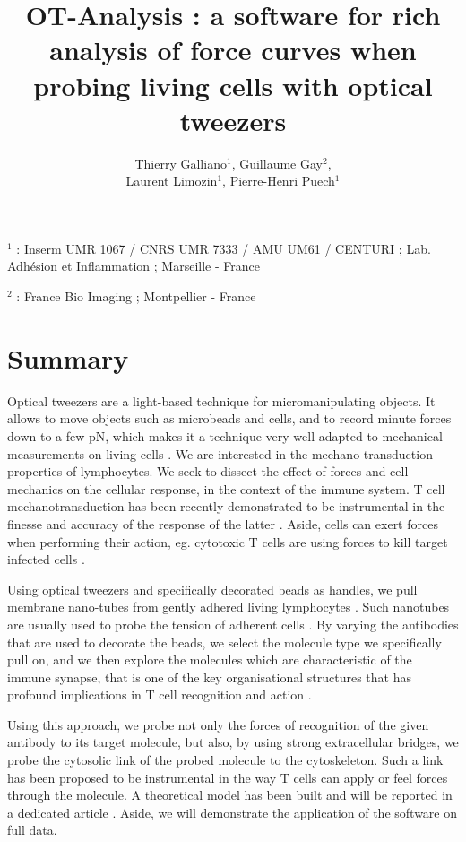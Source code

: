 \documentclass[a4paper]{article}
\title{OT-Analysis : a software for rich analysis of force
	curves when probing living cells with optical tweezers }
\author{Thierry Galliano$^1$, Guillaume Gay$^2$,\\ Laurent Limozin$^1$, Pierre-Henri Puech$^1$}
\date{}
\begin{document}
\maketitle

\noindent $^1$ : Inserm UMR 1067 / CNRS UMR 7333 / AMU UM61 / CENTURI  ; Lab. Adhésion et Inflammation ; Marseille - France

\noindent $^2$ : France Bio Imaging ; Montpellier - France

\section{Summary}\label{summary}

Optical tweezers are a light-based technique for micromanipulating
objects. It allows to move objects such as microbeads and cells, and to record minute forces down to a few pN, which makes it a technique very well adapted to
mechanical measurements on living cells \cite{gennerich_optical_2017}.
We are interested in the mechano-transduction properties of lymphocytes. We seek to dissect the effect of forces and cell mechanics on the
cellular response, in the context of the immune system. T cell mechanotransduction has been
recently demonstrated to be instrumental in the finesse and accuracy of the
response of the latter \cite{puech_mechanotransduction_2021}. Aside,
cells can exert forces when performing their action, eg. cytotoxic T
cells are using forces to kill target infected cells
\cite{basu_cytotoxic_2016}.

Using optical tweezers and specifically decorated beads as handles, we
pull membrane nano-tubes from gently adhered living lymphocytes
\cite{sadoun_dissecting_2020}. Such nanotubes are usually used to
probe the tension of adherent cells \cite{diz-munoz_control_2010}. By
varying the antibodies that are used to decorate the beads, we select
the molecule type we specifically pull on, and we then explore the
molecules which are characteristic of the immune synapse, that is one of
the key organisational structures that has profound implications in T
cell recognition and action \cite{baldari_immune_2017}.

Using this approach, we probe not only the forces of recognition of the
given antibody to its target molecule, but also, by using strong
extracellular bridges, we probe the cytosolic link of the probed molecule
to the cytoskeleton. Such a link has been proposed to be instrumental in
the way T cells can apply or feel forces through the molecule. A
theoretical model has been built and will be reported in a dedicated
article \cite{manca_membrane_2022}. Aside, we will demonstrate the application of the software on full data.
\end{document}
